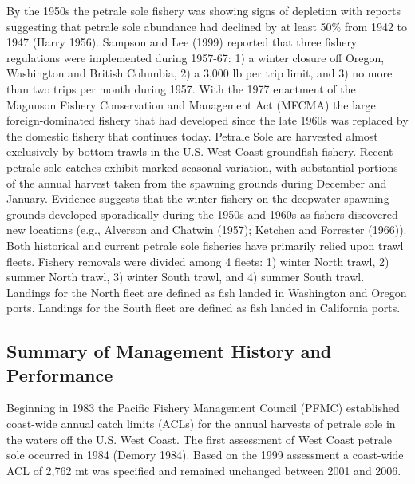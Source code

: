 \documentclass[11pt,
  english,
  letterpaper,
]{article}
\begin{document}
By the 1950s the petrale sole fishery was showing signs of depletion with reports suggesting that petrale sole abundance had declined by at least 50\% from 1942 to 1947 (Harry 1956). Sampson and Lee (1999) reported that three fishery regulations were implemented during 1957-67: 1) a winter closure off Oregon, Washington and British Columbia, 2) a 3,000 lb per trip limit, and 3) no more than two trips per month during 1957. With the 1977 enactment of the Magnuson Fishery Conservation and Management Act (MFCMA) the large foreign-dominated fishery that had developed since the late 1960s was replaced by the domestic fishery that continues today. Petrale Sole are harvested almost exclusively by bottom trawls in the U.S. West Coast groundfish fishery. Recent petrale sole catches exhibit marked seasonal variation, with substantial portions of the annual harvest taken from the spawning grounds during December and January. Evidence suggests that the winter fishery on the deepwater spawning grounds developed sporadically during the 1950s and 1960s as fishers discovered new locations (e.g., Alverson and Chatwin (1957); Ketchen and Forrester (1966)). Both historical and current petrale sole fisheries have primarily relied upon trawl fleets. Fishery removals were divided among 4 fleets: 1) winter North trawl, 2) summer North trawl, 3) winter South trawl, and 4) summer South trawl. Landings for the North fleet are defined as fish landed in Washington and Oregon ports. Landings for the South fleet are defined as fish landed in California ports.

\hypertarget{summary-of-management-history-and-performance}{%
\subsection{Summary of Management History and Performance}\label{summary-of-management-history-and-performance}}

Beginning in 1983 the Pacific Fishery Management Council (PFMC) established coast-wide annual catch limits (ACLs) for the annual harvests of petrale sole in the waters off the U.S. West Coast. The first assessment of West Coast petrale sole occurred in 1984 (Demory 1984). Based on the 1999 assessment a coast-wide ACL of 2,762 mt was specified and remained unchanged between 2001 and 2006.
\end{document}
